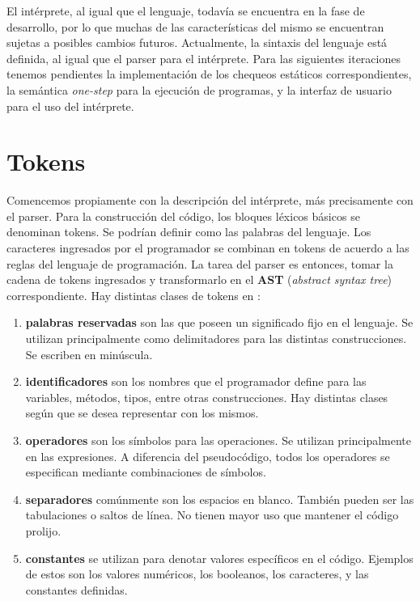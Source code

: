 \documentclass{article}
\begin{document}
El intérprete, al igual que el lenguaje, todavía se encuentra en la fase de desarrollo, por lo que muchas de las características del mismo se encuentran sujetas a posibles cambios futuros.
Actualmente, la sintaxis del lenguaje está definida, al igual que el parser para el intérprete.
Para las siguientes iteraciones tenemos pendientes la implementación de los chequeos estáticos correspondientes, la semántica \textit{one-step} para la ejecución de programas, y la interfaz de usuario para el uso del intérprete.

\section{Tokens}

Comencemos propiamente con la descripción del intérprete, más precisamente con el parser.
Para la construcción del código, los bloques léxicos básicos se denominan tokens.
Se podrían definir como las palabras del lenguaje.
Los caracteres ingresados por el programador se combinan en tokens de acuerdo a las reglas del lenguaje de programación.
La tarea del parser es entonces, tomar la cadena de tokens ingresados y transformarlo en el \textbf{AST} (\textit{abstract syntax tree}) correspondiente.
Hay distintas clases de tokens en \Lang:

\begin{enumerate}

\item
\textbf{palabras reservadas} son las que poseen un significado fijo en el lenguaje.
Se utilizan principalmente como delimitadores para las distintas construcciones.
Se escriben en minúscula.

\item
\textbf{identificadores} son los nombres que el programador define para las variables, métodos, tipos, entre otras construcciones.
Hay distintas clases según que se desea representar con los mismos.

\item
\textbf{operadores} son los símbolos para las operaciones.
Se utilizan principalmente en las expresiones.
A diferencia del pseudocódigo, todos los operadores se especifican mediante combinaciones de símbolos. 

\item
\textbf{separadores} comúnmente son los espacios en blanco.
También pueden ser las tabulaciones o saltos de línea.
No tienen mayor uso que mantener el código prolijo.

\item
\textbf{constantes} se utilizan para denotar valores específicos en el código.
Ejemplos de estos son los valores numéricos, los booleanos, los caracteres, y las constantes definidas.

\end{enumerate}
\end{document}
